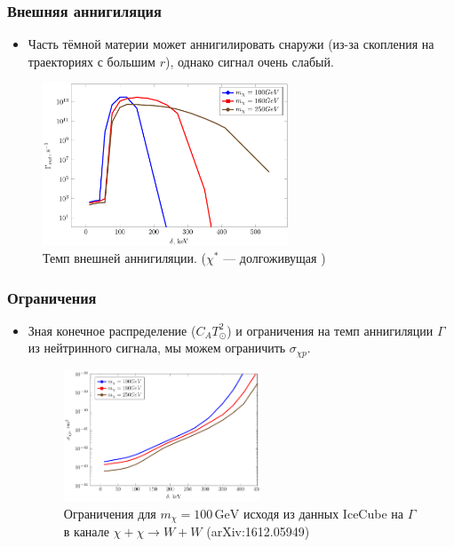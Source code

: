 \documentclass[
11pt,]{beamer}
\begin{document}
	\begin{frame}
		\frametitle{Внешняя аннигиляция}
		\begin{itemize}
	\item Часть тёмной материи может аннигилировать снаружи (из-за скопления на траекториях с большим $r$), однако сигнал очень слабый.
\end{itemize}

\begin{figure}[!h]
	\centering
	\includegraphics[width=0.65\textwidth]{images/Aout.png}
	\caption{Темп внешней аннигиляции. ($\chi^*$ --- долгоживущая )}
\end{figure}
	\end{frame}
	
	\begin{frame}
		\frametitle{Ограничения}
		\begin{itemize}
	\item Зная конечное распределение ($C_A T_{\odot}^2$) и ограничения на темп аннигиляции  $\Gamma$ из нейтринного сигнала, мы можем ограничить $\sigma_{\chi p}$. 
	\begin{figure}[!h]
		\centering
		\includegraphics[width=0.55\textwidth]{images/Constrains.png}
		\caption{Ограничения для $m_{\chi} = 100 \, \text{GeV}$ исходя из данных IceCube  на $\Gamma$ в канале $\chi+\chi \to W + W$ (arXiv:1612.05949)} 
	\end{figure}
\end{itemize}

	\end{frame}
	
\end{document}
